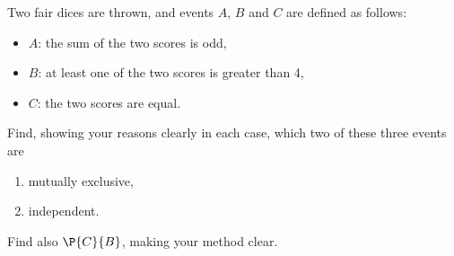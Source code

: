 \clearpage
\begin{problem}
    Two fair dices are thrown, and events $A$, $B$ and $C$ are defined as follows:
    \begin{itemize}
        \item $A$: the sum of the two scores is odd,
        \item $B$: at least one of the two scores is greater than 4,
        \item $C$: the two scores are equal.
    \end{itemize}
    Find, showing your reasons clearly in each case, which two of these three events are
    \begin{enumerate}
        \item mutually exclusive,
        \item independent.
    \end{enumerate}
    Find also $\P{C}{B}$, making your method clear.
\end{problem}
